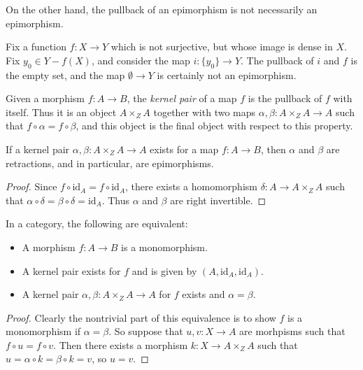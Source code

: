 On the other hand, the pullback of an epimorphism is not necessarily an epimorphism.

\begin{example}
    Fix a function $f:X \to Y$ which is not surjective, but whose image is dense in $X$. Fix $y_0 \in Y - f(X)$, and consider the map $i: \{ y_0 \} \to Y$. The pullback of $i$ and $f$ is the empty set, and the map $\emptyset \to Y$ is certainly not an epimorphism.
\end{example}

Given a morphism $f: A \to B$, the \emph{kernel pair} of a map $f$ is the pullback of $f$ with itself. Thus it is an object $A \times_Z A$ together with two maps $\alpha, \beta: A \times_Z A \to A$ such that $f \circ \alpha = f \circ \beta$, and this object is the final object with respect to this property.

\begin{lemma}
    If a kernel pair $\alpha,\beta: A \times_Z A \to A$ exists for a map $f: A \to B$, then $\alpha$ and $\beta$ are retractions, and in particular, are epimorphisms.
\end{lemma}
\begin{proof}
    Since $f \circ \text{id}_A = f \circ \text{id}_A$, there exists a homomorphism $\delta: A \to A \times_Z A$ such that $\alpha \circ \delta = \beta \circ \delta = \text{id}_A$. Thus $\alpha$ and $\beta$ are right invertible.
\end{proof}

\begin{lemma}
    In a category, the following are equivalent:
    \begin{itemize}
        \item A morphism $f: A \to B$ is a monomorphism.
        \item A kernel pair exists for $f$ and is given by $(A,\text{id}_A, \text{id}_A)$.
        \item A kernel pair $\alpha,\beta: A \times_Z A \to A$ for $f$ exists and $\alpha = \beta$.
    \end{itemize}
\end{lemma}
\begin{proof}
    Clearly the nontrivial part of this equivalence is to show $f$ is a monomorphism if $\alpha = \beta$. So suppose that $u,v: X \to A$ are morhpisms such that $f \circ u = f \circ v$. Then there exists a morphism $k: X \to A \times_Z A$ such that $u = \alpha \circ k = \beta \circ k = v$, so $u = v$.
\end{proof}

